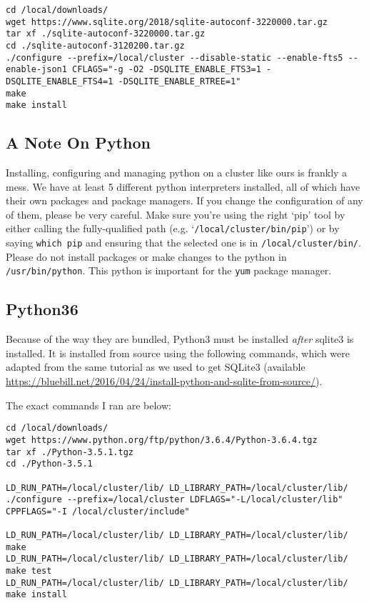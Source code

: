 \documentclass[]{book}
\begin{document}
\begin{verbatim}
cd /local/downloads/
wget https://www.sqlite.org/2018/sqlite-autoconf-3220000.tar.gz
tar xf ./sqlite-autoconf-3220000.tar.gz
cd ./sqlite-autoconf-3120200.tar.gz
./configure --prefix=/local/cluster --disable-static --enable-fts5 --enable-json1 CFLAGS="-g -O2 -DSQLITE_ENABLE_FTS3=1 -DSQLITE_ENABLE_FTS4=1 -DSQLITE_ENABLE_RTREE=1"
make
make install
\end{verbatim}

\subsection{A Note On Python}\label{a-note-on-python}

Installing, configuring and managing python on a cluster like ours is
frankly a mess. We have at least 5 different python interpreters
installed, all of which have their own packages and package managers. If
you change the configuration of any of them, please be very careful.
Make sure you're using the right `pip' tool by either calling the
fully-qualified path (e.g. `\texttt{/local/cluster/bin/pip}') or by
saying \texttt{which\ pip} and ensuring that the selected one is in
\texttt{/local/cluster/bin/}. Please do not install packages or make
changes to the python in \texttt{/usr/bin/python}. This python is
important for the \texttt{yum} package manager.

\subsection{Python36}\label{python36}

Because of the way they are bundled, Python3 must be installed
\emph{after} sqlite3 is installed. It is installed from source using the
following commands, which were adapted from the same tutorial as we used
to get SQLite3 (available
\href{Here}{https://bluebill.net/2016/04/24/install-python-and-sqlite-from-source/}).

The exact commands I ran are below:

\begin{verbatim}
cd /local/downloads/
wget https://www.python.org/ftp/python/3.6.4/Python-3.6.4.tgz
tar xf ./Python-3.5.1.tgz
cd ./Python-3.5.1

LD_RUN_PATH=/local/cluster/lib/ LD_LIBRARY_PATH=/local/cluster/lib/ ./configure --prefix=/local/cluster LDFLAGS="-L/local/cluster/lib" CPPFLAGS="-I /local/cluster/include"

LD_RUN_PATH=/local/cluster/lib/ LD_LIBRARY_PATH=/local/cluster/lib/ make
LD_RUN_PATH=/local/cluster/lib/ LD_LIBRARY_PATH=/local/cluster/lib/ make test
LD_RUN_PATH=/local/cluster/lib/ LD_LIBRARY_PATH=/local/cluster/lib/ make install
\end{verbatim}
\end{document}
